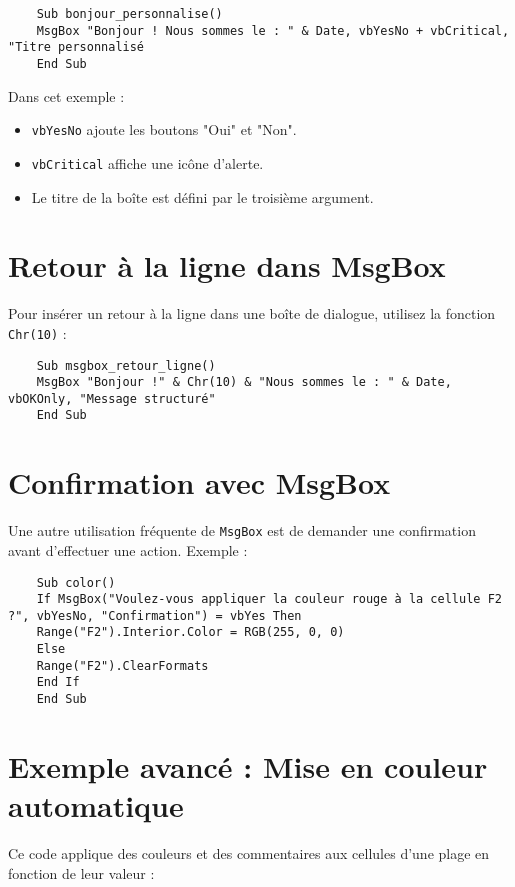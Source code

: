 \documentclass[a4paper,12pt]{report}
\begin{document}
\begin{lstlisting}
	Sub bonjour_personnalise()
	MsgBox "Bonjour ! Nous sommes le : " & Date, vbYesNo + vbCritical, "Titre personnalisé
	End Sub
\end{lstlisting}

Dans cet exemple :
\begin{itemize}
	\item \texttt{vbYesNo} ajoute les boutons "Oui" et "Non".
	\item \texttt{vbCritical} affiche une icône d'alerte.
	\item Le titre de la boîte est défini par le troisième argument.
\end{itemize}

\section{Retour à la ligne dans MsgBox}
Pour insérer un retour à la ligne dans une boîte de dialogue, utilisez la fonction \texttt{Chr(10)} :

\begin{lstlisting}
	Sub msgbox_retour_ligne()
	MsgBox "Bonjour !" & Chr(10) & "Nous sommes le : " & Date, vbOKOnly, "Message structuré"
	End Sub
\end{lstlisting}

\section{Confirmation avec MsgBox}
Une autre utilisation fréquente de \texttt{MsgBox} est de demander une confirmation avant d'effectuer une action. Exemple :

\begin{lstlisting}
	Sub color()
	If MsgBox("Voulez-vous appliquer la couleur rouge à la cellule F2 ?", vbYesNo, "Confirmation") = vbYes Then
	Range("F2").Interior.Color = RGB(255, 0, 0)
	Else
	Range("F2").ClearFormats
	End If
	End Sub
\end{lstlisting}
\newpage
\section{Exemple avancé : Mise en couleur automatique}

Ce code applique des couleurs et des commentaires aux cellules d'une plage en fonction de leur valeur :
\end{document}
